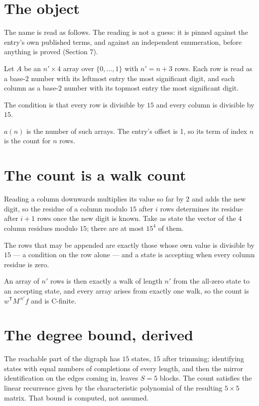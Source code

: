 \documentclass[11pt]{article}
\theoremstyle{definition}
\begin{document}
\section{The object}

The name is read as follows. The reading is not a guess: it is pinned against the entry's own published terms, and against an independent enumeration, before anything is proved (Section 7).

Let $A$ be an $n' \times 4$ array over $\{0,\dots,1\}$ with $n' = n + 3$ rows. Each row is read as a base-$2$ number with its leftmost entry the most significant digit, and each column as a base-$2$ number with its topmost entry the most significant digit.

The condition is that every row is divisible by $15$ and every column is divisible by $15$.

$a(n)$ is the number of such arrays. The entry's offset is 1, so its term of index $n$ is the count for $n$ rows.

\section{The count is a walk count}

Reading a column downwards multiplies its value so far by $2$ and adds the new digit, so the residue of a column modulo $15$ after $i$ rows determines its residue after $i+1$ rows once the new digit is known. Take as state the vector of the $4$ column residues modulo $15$; there are at most $15^{4}$ of them.

The rows that may be appended are exactly those whose own value is divisible by $15$ --- a condition on the row alone --- and a state is accepting when every column residue is zero.

An array of $n'$ rows is then exactly a walk of length $n'$ from the all-zero state to an accepting state, and every array arises from exactly one walk, so the count is $w^{\mathsf T}M^{\,n'}f$ and is C-finite.

\section{The degree bound, derived}

The reachable part of the digraph has $15$ states, $15$ after trimming; identifying states with equal numbers of completions of every length, and then the mirror identification on the edges coming in, leaves $S = 5$ blocks. The count satisfies the linear recurrence given by the characteristic polynomial of the resulting $5\times5$ matrix. That bound is computed, not assumed.
\end{document}
